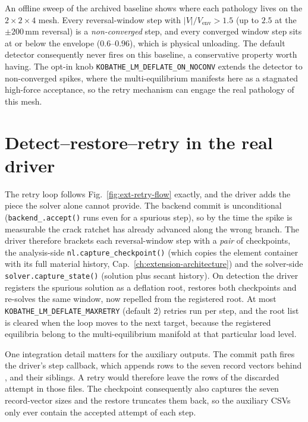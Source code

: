 An offline sweep of the archived baseline shows where each pathology
lives on the $2{\times}2{\times}4$ mesh. Every reversal-window step with
$|V|/V_{\mathrm{env}} > 1.5$ (up to $2.5$ at the $\pm 200$\,mm reversal)
is a \emph{non-converged} step, and every converged window step sits at
or below the envelope ($0.6$--$0.96$), which is physical unloading. The
default detector consequently never fires on this baseline, a
conservative property worth having. The opt-in knob
\texttt{KOBATHE\_LM\_DEFLATE\_ON\_NOCONV} extends the detector to
non-converged spikes, where the multi-equilibrium manifests here as a
stagnated high-force acceptance, so the retry mechanism can engage the
real pathology of this mesh.

\section{Detect--restore--retry in the real driver}
\label{sec:drv-retry}

The retry loop follows Fig.~\ref{fig:ext-retry-flow} exactly, and the
driver adds the piece the solver alone cannot provide. The backend commit
is unconditional (\texttt{backend\_.accept()} runs even for a spurious
step), so by the time the spike is measurable the crack ratchet has
already advanced along the wrong branch. The driver therefore brackets
each reversal-window step with a \emph{pair} of checkpoints, the
analysis-side \texttt{nl.capture\_checkpoint()} (which copies the element
container with its full material history, Cap.~\ref{ch:extension-architecture})
and the solver-side \texttt{solver.capture\_state()} (solution plus
secant history). On detection the driver registers the spurious solution
as a deflation root, restores both checkpoints and re-solves the same
window, now repelled from the registered root. At most
\texttt{KOBATHE\_LM\_DEFLATE\_MAXRETRY} (default 2) retries run per step,
and the root list is cleared when the loop moves to the next target,
because the registered equilibria belong to the multi-equilibrium
manifold at that particular load level.

One integration detail matters for the auxiliary outputs. The commit path
fires the driver's step callback, which appends rows to the seven record
vectors behind ,  and their
siblings. A retry would therefore leave the rows of the discarded attempt
in those files. The checkpoint consequently also captures the seven
record-vector sizes and the restore truncates them back, so the auxiliary
CSVs only ever contain the accepted attempt of each step.

